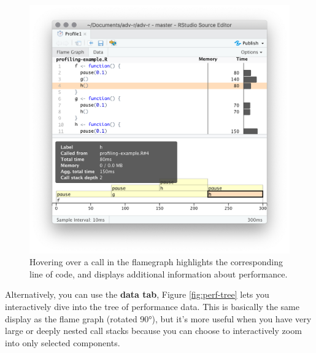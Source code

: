 \documentclass[]{book}
\begin{document}
\begin{figure}

{\centering \includegraphics[width=1\linewidth]{screenshots/performance/info} 

}

\caption{Hovering over a call in the flamegraph highlights the corresponding line of code, and displays additional information about performance.}\label{fig:perf-info}
\end{figure}

Alternatively, you can use the \textbf{data tab}, Figure \ref{fig:perf-tree} lets you interactively dive into the tree of performance data. This is basically the same display as the flame graph (rotated 90°), but it's more useful when you have very large or deeply nested call stacks because you can choose to interactively zoom into only selected components.
\end{document}
